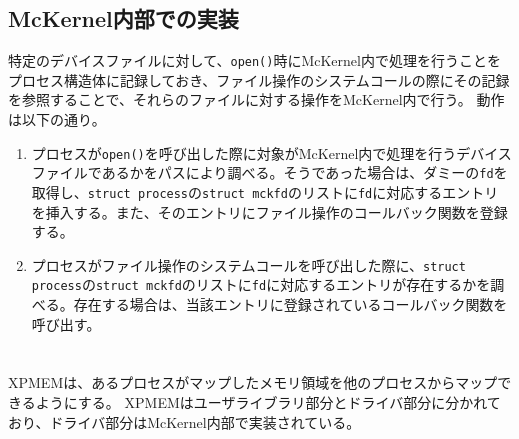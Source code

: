 \documentclass[twoside,11pt,fleqn]{book}
\begin{document}
\subsection{McKernel内部での実装}\label{sec:mckfd}
特定のデバイスファイルに対して、\texttt{open()}時にMcKernel内で処理を行うことをプロセス構造体に記録しておき、ファイル操作のシステムコールの際にその記録を参照することで、それらのファイルに対する操作をMcKernel内で行う。
動作は以下の通り。
\begin{enumerate}
\item プロセスが\texttt{open()}を呼び出した際に対象がMcKernel内で処理を行うデバイスファイルであるかをパスにより調べる。そうであった場合は、ダミーの\texttt{fd}を取得し、\texttt{struct process}の\texttt{struct mckfd}のリストに\texttt{fd}に対応するエントリを挿入する。また、そのエントリにファイル操作のコールバック関数を登録する。
\item プロセスがファイル操作のシステムコールを呼び出した際に、\texttt{struct process}の\texttt{struct mckfd}のリストに\texttt{fd}に対応するエントリが存在するかを調べる。存在する場合は、当該エントリに登録されているコールバック関数を呼び出す。
\end{enumerate}

\section{}
XPMEMは、あるプロセスがマップしたメモリ領域を他のプロセスからマップできるようにする。
XPMEMはユーザライブラリ部分とドライバ部分に分かれており、ドライバ部分はMcKernel内部で実装されている。


\end{document}
